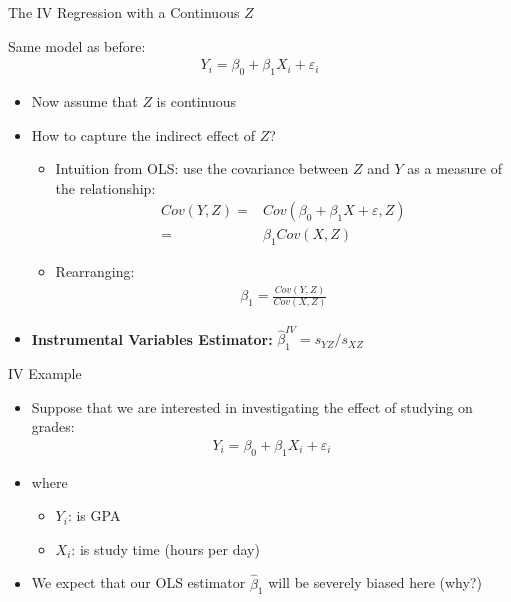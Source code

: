 \documentclass[aspectratio=169,11pt]{beamer}
\begin{document}
\begin{frame}{The IV  Regression with a Continuous $Z$}

Same model as before:
\begin{align*}
	Y_i = \beta_0 + \beta_1 X_i + \varepsilon_i
\end{align*}



\begin{itemize}
	\item Now assume that $Z$ is continuous
	\item How to capture the indirect effect of $Z$?
		\begin{itemize}
			\item Intuition from OLS: use the covariance between $Z$ and $Y$ as a measure of the relationship:
	\begin{align*}
	Cov(Y,Z) =& Cov(\beta_0 + \beta_1 X + \varepsilon,Z)\\
			 =& \beta_1 Cov(X,Z)
	\end{align*}
			\item Rearranging:
				\begin{align*}
					\beta_1= \frac{Cov(Y,Z)}{Cov(X,Z)}
				\end{align*}
		\end{itemize}
	\item {\bf Instrumental Variables Estimator:} $\hat\beta^{IV}_1 = s_{YZ}/ s_{XZ}$

\end{itemize}
\end{frame}


\begin{frame}{IV Example}
\begin{itemize}

\item Suppose that we are interested in investigating the effect of studying on grades:
\begin{align*}
Y_i=\beta_0 + \beta_1 X_i + \varepsilon_i
\end{align*}
\item where
\begin{itemize}
\item $Y_i$: is GPA
\item $X_i$: is study time (hours per day)
\end{itemize}
\medskip
\item We expect that our OLS estimator $\hat{\beta}_1$ will be severely biased here (why?)
\end{itemize}
\end{frame}
\end{document}
